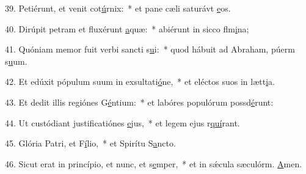 39. Petiérunt, et venit cot\uline{ú}rnix:~* et pane cæli saturávt \uline{e}os.\par 
40. Dirúpit petram et fluxérunt \uline{a}quæ:~* abiérunt in sicco flm\uline{i}na;\par 
41. Quóniam memor fuit verbi sancti s\uline{u}i:~* quod hábuit ad Abraham, púerm s\uline{u}um.\par 
42. Et edúxit pópulum suum in exsultati\uline{ó}ne,~* et eléctos suos in lætt\uline{i}a.\par 
43. Et dedit illis regiónes G\uline{é}ntium:~* et labóres populórum possd\uline{é}runt:\par 
44. Ut custódiant justificatiónes \uline{e}jus,~* et legem ejus r\uline{quí}rant.\par 
45. Glória Patri, et F\uline{í}lio,~* et Spirítu S\uline{a}ncto.\par 
46. Sicut erat in princípio, et nunc, et s\uline{e}mper,~* et in sǽcula sæculórm. \uline{A}men.\par 
